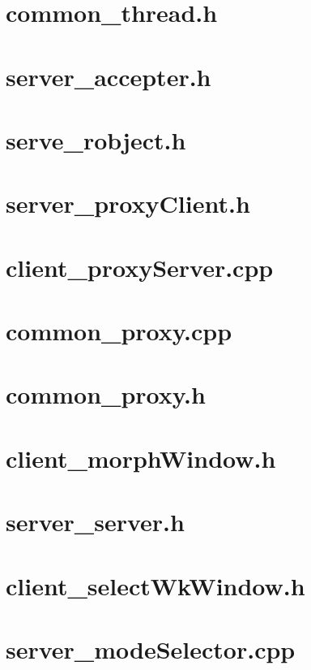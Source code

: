 \documentclass{article}
\begin{document}
\section{ common\_thread.h }

\newpage
\section{ server\_accepter.h }

\newpage
\section{ serve\_robject.h }

\newpage
\section{ server\_proxyClient.h }

\newpage
\section{ client\_proxyServer.cpp }

\newpage
\section{ common\_proxy.cpp }

\newpage
\section{ common\_proxy.h }

\newpage
\section{ client\_morphWindow.h }

\newpage
\section{ server\_server.h }

\newpage
\section{ client\_selectWkWindow.h }

\newpage
\section{ server\_modeSelector.cpp }
\end{document}
